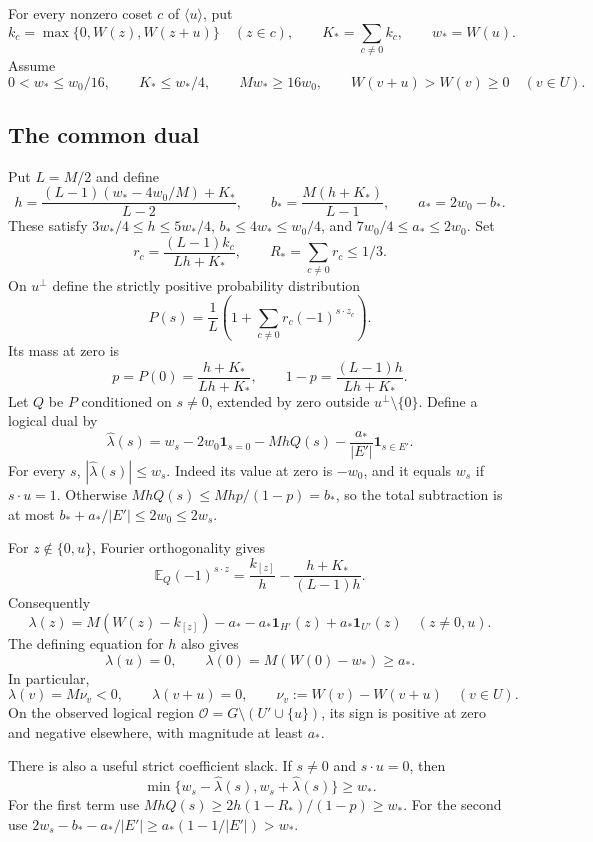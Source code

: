 For every nonzero coset $c$ of $\langle u\rangle$, put
\[
 k_c=\max\{0,W(z),W(z+u)\}\quad(z\in c),\qquad
 K_* =\sum_{c\ne0}k_c,\qquad w_*=W(u).
\]
Assume
\begin{equation}\label{eq:rect-dominance}
 0<w_*\le w_0/16,\qquad K_*\le w_*/4,\qquad M w_*\ge16w_0,
 \qquad W(v+u)>W(v)\ge0\quad(v\in U).
\end{equation}

\subsection{The common dual}

Put $L=M/2$ and define
\[
 h=\frac{(L-1)(w_*-4w_0/M)+K_*}{L-2},\qquad
 b_* =\frac{M(h+K_*)}{L-1},\qquad a_*=2w_0-b_*.
\]
These satisfy $3w_*/4\le h\le5w_*/4$, $b_*\le4w_*\le w_0/4$,
and $7w_0/4\le a_*\le2w_0$. Set
\[
 r_c=\frac{(L-1)k_c}{Lh+K_*},\qquad R_*=\sum_{c\ne0}r_c\le1/3.
\]
On $u^\perp$ define the strictly positive probability distribution
\[
 P(s)=\frac1L\left(1+\sum_{c\ne0}r_c(-1)^{s\cdot z_c}\right).
\]
Its mass at zero is
\[
 p=P(0)=\frac{h+K_*}{Lh+K_*},\qquad
 1-p=\frac{(L-1)h}{Lh+K_*}.
\]
Let $Q$ be $P$ conditioned on $s\ne0$, extended by zero outside
$u^\perp\setminus\{0\}$. Define a logical dual by
\begin{equation}\label{eq:rect-dual}
 \widehat\lambda(s)=w_s-2w_0\mathbf1_{s=0}
                    -MhQ(s)-\frac{a_*}{|E'|}\mathbf1_{s\in E'}.
\end{equation}
For every $s$, $|\widehat\lambda(s)|\le w_s$. Indeed its value at zero
is $-w_0$, and it equals $w_s$ if $s\cdot u=1$. Otherwise
$MhQ(s)\le Mh p/(1-p)=b_*$, so the total subtraction is at most
$b_*+a_*/|E'|\le2w_0\le2w_s$.

For $z\notin\{0,u\}$, Fourier orthogonality gives
\[
 \mathbb E_Q(-1)^{s\cdot z}
 =\frac{k_{[z]}}h-\frac{h+K_*}{(L-1)h}.
\]
Consequently
\begin{equation}\label{eq:rect-dual-values}
 \lambda(z)=M(W(z)-k_{[z]})-a_*
            -a_*\mathbf1_{H'}(z)+a_*\mathbf1_{U'}(z)
 \quad(z\ne0,u).
\end{equation}
The defining equation for $h$ also gives
\[
 \lambda(u)=0,\qquad \lambda(0)=M(W(0)-w_*)\ge a_*.
\]
In particular,
\[
 \lambda(v)=M\nu_v<0,\qquad \lambda(v+u)=0,
 \qquad \nu_v:=W(v)-W(v+u)\quad(v\in U).
\]
On the observed logical region
$\mathcal O=G\setminus(U'\cup\{u\})$, its sign is positive at zero
and negative elsewhere, with magnitude at least $a_*$.

There is also a useful strict coefficient slack. If $s\ne0$ and
$s\cdot u=0$, then
\begin{equation}\label{eq:rect-invariant-slack}
 \min\{w_s-\widehat\lambda(s),w_s+\widehat\lambda(s)\}\ge w_*.
\end{equation}
For the first term use
$MhQ(s)\ge2h(1-R_*)/(1-p)\ge w_*$.
For the second use
$2w_s-b_*-a_*/|E'|\ge a_*(1-1/|E'|)>w_*$.

